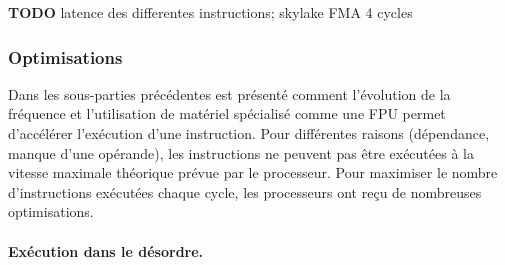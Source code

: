 \textbf{TODO} latence des differentes instructions; skylake FMA 4 cycles %







\subsubsection{Optimisations}

Dans les sous-parties précédentes est présenté comment l'évolution de la fréquence et l'utilisation de matériel spécialisé comme une FPU permet d'accélérer l'exécution d'une instruction. Pour différentes raisons (dépendance, manque d'une opérande), les instructions ne peuvent pas être exécutées à la vitesse maximale théorique prévue par le processeur. Pour maximiser le nombre d'instructions exécutées chaque cycle, les processeurs ont reçu de nombreuses optimisations. 

\paragraph{Exécution dans le désordre.}\label{sec:out_of_order}

